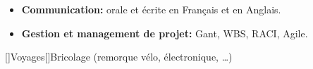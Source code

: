 \documentclass[11pt,a4paper,sans]{moderncv}        %
\newcommand{\myitem}{\textbullet}
\begin{document}
\begin{samepage}
{{\begin{itemize}[label=\myitem]
	\item \textbf{Communication: } {\small orale et écrite en Français et en Anglais.} %
	\item \textbf{Gestion et management de projet: } {\small Gant, WBS, RACI, Agile.}%
	\end{itemize}%
}}
[\bcfleur]{Voyages}[\bcvelo]{Bricolage (remorque vélo, électronique, …)}
%
\end{samepage}
\end{document}
